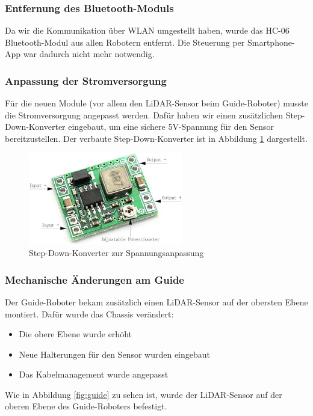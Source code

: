 \subsubsection{Entfernung des Bluetooth-Moduls}
Da wir die Kommunikation über WLAN umgestellt haben, wurde das HC-06 Bluetooth-Modul aus allen Robotern entfernt.
%
Die Steuerung per Smartphone-App war dadurch nicht mehr notwendig.

\subsubsection{Anpassung der Stromversorgung}
Für die neuen Module (vor allem den LiDAR-Sensor beim Guide-Roboter) musste die Stromversorgung angepasst werden.
%
Dafür haben wir einen zusätzlichen Step-Down-Konverter eingebaut, um eine sichere 5V-Spannung für den Sensor bereitzustellen.
%
Der verbaute Step-Down-Konverter ist in Abbildung \ref{fig:stepdown} dargestellt.

\begin{figure}[H]
    \centering
    \includegraphics[width=0.6\textwidth]{img/Hardware/stepdown.png}
    \caption{Step-Down-Konverter zur Spannungsanpassung}
    \label{fig:stepdown}
\end{figure}

\subsubsection{Mechanische Änderungen am Guide}
Der Guide-Roboter bekam zusätzlich einen LiDAR-Sensor auf der obersten Ebene montiert.
%
Dafür wurde das Chassis verändert:
\begin{itemize}
    \item Die obere Ebene wurde erhöht
    \item Neue Halterungen für den Sensor wurden eingebaut
    \item Das Kabelmanagement wurde angepasst
\end{itemize}
Wie in Abbildung \ref{fig:guide} zu sehen ist,
wurde der LiDAR-Sensor auf der oberen Ebene des Guide-Roboters befestigt.


